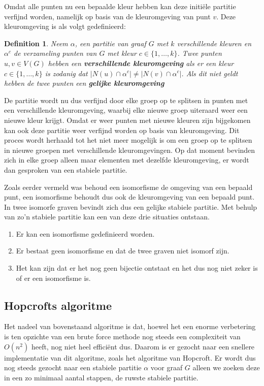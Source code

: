 \documentclass[twoside]{article}
\newtheorem{definition}{Definition}[section]
\begin{document}
\begin{multicols}{2}
Omdat alle punten nu een bepaalde kleur hebben kan deze initi\"ele partitie verfijnd worden, namelijk op basis van de kleuromgeving van punt $v$. Deze kleuromgeving is als volgt gedefinieerd:

\begin{definition}
Neem $\alpha$, een partitie van graaf $G$ met $k$ verschillende kleuren en  $\alpha^{c}$ de verzameling punten van $G$ met kleur $c \in \{1,\ldots,k\}$. Twee punten $u,v \in V(G)$ hebben een \textbf{verschillende kleuromgeving} als er een kleur $c \in \{1,\ldots,k\}$ is zodanig dat $|N(u)\cap\alpha^{c}| \neq |N(v)\cap\alpha^{c}|$. Als dit niet geldt hebben de twee punten een \textbf{gelijke kleuromgeving}
\cite{slides_DFA}
\end{definition}


De partitie wordt nu dus verfijnd door elke groep op te splitsen in punten met een verschillende kleuromgeving, waarbij elke nieuwe groep uiteraard weer een nieuwe kleur krijgt. Omdat er weer punten met nieuwe kleuren zijn bijgekomen kan ook deze partitie weer verfijnd worden op basis van kleuromgeving. Dit proces wordt herhaald tot het niet meer mogelijk is om een groep op te splitsen in nieuwe groepen met verschillende kleuromgevingen. Op dat moment bevinden zich in elke groep alleen maar elementen met dezelfde kleuromgeving, er wordt dan gesproken van een stabiele partitie.

Zoals eerder vermeld was behoud een isomorfisme de omgeving van een bepaald punt, een isomorfisme behoudt dus ook de kleuromgeving van een bepaald punt. In twee isomorfe graven bevindt zich dus een gelijke stabiele partitie. Met behulp van zo'n stabiele partitie kan een van deze drie situaties ontstaan.
\begin{enumerate}
\item Er kan een isomorfisme gedefinieerd worden.
\item Er bestaat geen isomorfisme en dat de twee graven niet isomorf zijn.
\item Het kan zijn dat er het nog geen bijectie ontstaat en het dus nog niet zeker is of er een isomorfisme is.
\end{enumerate}

\subsection{Hopcrofts algoritme}
Het nadeel van bovenstaand algoritme is dat, hoewel het een enorme verbetering is ten opzichte van een brute force methode nog steeds een complexiteit van $O(n^2)$ heeft, nog niet heel effici\"ent dus. Daarom is er gezocht naar een snellere implementatie van dit algoritme, zoals het algoritme van Hopcroft. Er wordt dus nog steeds gezocht naar een stabiele partitie $\alpha$ voor graaf $G$ alleen we zoeken deze in een zo minimaal aantal stappen, de ruwste stabiele partitie.


\end{multicols}
\end{document}
